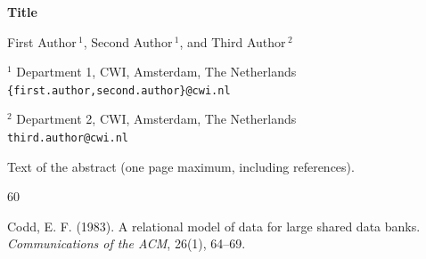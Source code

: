 \documentclass[11pt]{article}
\begin{document}
\begin{center}
    \Large{\textbf{Title}}
    
    \vspace{0.5cm}
    
    
    \large{First Author$\,^1$, Second Author$\,^1$, and Third Author$\,^2$}
    
    \vspace{0.5cm}
    
    \normalsize
    
    
    $^1$ Department 1, CWI, Amsterdam, The Netherlands\\
    \texttt{\{first.author,second.author\}@cwi.nl}
    
    $^2$ Department 2, CWI, Amsterdam, The Netherlands\\
    \texttt{third.author@cwi.nl}
    
    \vspace{0.6cm}
    
\end{center}

Text of the abstract (one page maximum, including references).

\begin{thebibliography}{60}

 Codd, E. F. (1983). A relational model of data for large shared data banks. \textit{Communications of the ACM}, 26(1), 64--69.

\end{thebibliography}
\end{document}

